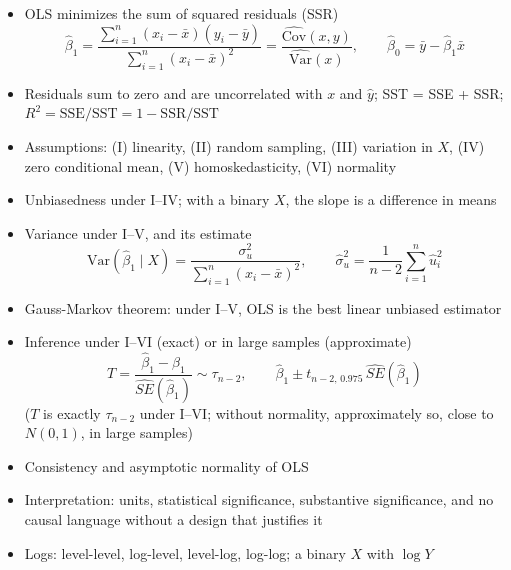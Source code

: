 \documentclass[11pt]{article}
\newcommand\Var{\text{Var}}
\newcommand\Cov{\text{Cov}}
\begin{document}
\begin{itemize}
\item OLS minimizes the sum of squared residuals (SSR)
\[
\hat\beta_1=\frac{\sum_{i=1}^n(x_i-\bar x)(y_i-\bar y)}{\sum_{i=1}^n(x_i-\bar x)^2}
=\frac{\widehat{\Cov}(x,y)}{\widehat{\Var}(x)},
\qquad \hat\beta_0=\bar y-\hat\beta_1\bar x
\]
\item Residuals sum to zero and are uncorrelated with $x$ and $\hat y$; SST = SSE + SSR;
  $R^2 = \text{SSE}/\text{SST} = 1-\text{SSR}/\text{SST}$
\item Assumptions: (I) linearity, (II) random sampling, (III) variation in $X$, (IV) zero conditional
  mean, (V) homoskedasticity, (VI) normality
\item Unbiasedness under I--IV; with a binary $X$, the slope is a difference in means
\item Variance under I--V, and its estimate
\[
\Var(\hat\beta_1\mid X)=\frac{\sigma_u^2}{\sum_{i=1}^n(x_i-\bar x)^2},
\qquad \hat\sigma_u^2=\frac{1}{n-2}\sum_{i=1}^n\hat u_i^2
\]
\item Gauss-Markov theorem: under I--V, OLS is the best linear unbiased estimator
\item Inference under I--VI (exact) or in large samples (approximate)
\[
T=\frac{\hat\beta_1-\beta_1}{\widehat{SE}(\hat\beta_1)}\sim\tau_{n-2},
\qquad \hat\beta_1 \pm t_{n-2,\,0.975}\,\widehat{SE}(\hat\beta_1)
\]
($T$ is exactly $\tau_{n-2}$ under I--VI; without normality, approximately so, close to $N(0,1)$, in large samples)
\item Consistency and asymptotic normality of OLS
\item Interpretation: units, statistical significance, substantive significance, and no causal
  language without a design that justifies it
\item Logs: level-level, log-level, level-log, log-log; a binary $X$ with $\log Y$
\end{itemize}
\end{document}
